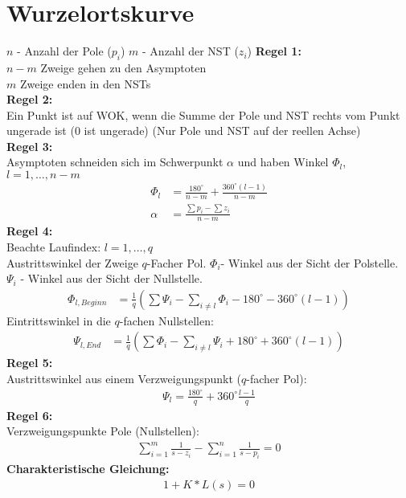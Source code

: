     \section{Wurzelortskurve}
\begin{tcolorbox}[colback=white!10!white,colframe=blue!50!white,title=Konstruktionsregeln]
    $n$ - Anzahl der Pole ($p_i$)\hspace{1cm}
    $m$ - Anzahl der NST ($z_i$)
    \tcblower  %
    \textbf{Regel 1:}\\
    $n-m$ Zweige gehen zu den  Asymptoten\\
    $m$ Zweige enden in den NSTs\\

    \textbf{Regel 2:}\\
        Ein Punkt ist auf WOK, wenn die Summe der Pole und NST rechts vom Punkt ungerade ist (0 ist ungerade) (Nur Pole und NST auf der reellen Achse)\\
        
    \textbf{Regel 3:}\\
    Asymptoten schneiden sich im Schwerpunkt $\alpha$ und haben Winkel $\Phi_l$, $l =1,\dots,n-m$
    \begin{align*}
        \Phi_l &= \frac{180^\circ}{n-m}+\frac{360^\circ(l-1)}{n-m}\\
        \alpha &=    \frac{\sum p_i - \sum z_i}{n-m}
    \end{align*}
        \textbf{Regel 4:}\\
        Beachte Laufindex: $l=1,\dots,q$\\
        Austrittswinkel  der Zweige $q$-Facher Pol. $\Phi_i$- Winkel aus der Sicht der Polstelle. $\Psi_i$ - Winkel aus der Sicht der Nullstelle.
        \begin{align*}
            \Phi_{l,Beginn} &= \frac{1}{q}\left (\sum\Psi_i-\sum_{i\not= l}\Phi_i-180^\circ-360^\circ(l-1)\right )
        \end{align*}
        Eintrittswinkel in die $q$-fachen Nullstellen:
        \begin{align*}
            \Psi_{l,End} &= \frac{1}{q}\left (\sum\Phi_i-\sum_{i\not= l}\Psi_i+180^\circ+360^\circ(l-1)\right )
        \end{align*}
        \textbf{Regel 5:}\\
        Austrittswinkel aus einem Verzweigungspunkt ($q$-facher Pol):
        \begin{align*}
            \Psi_l = \frac{180^\circ}{q}+360^\circ\frac{l-1}{q}
        \end{align*}
        \textbf{Regel 6:}\\
        Verzweigungspunkte Pole (Nullstellen):
        \begin{align*}
            \sum_{i=1}^{m}\frac{1}{s-z_i}-\sum_{i=1}^{n}\frac{1}{s-p_i} =0
        \end{align*}
        \textbf{Charakteristische Gleichung:}
        \begin{align*}
            1+ K*L(s) = 0
        \end{align*}
        

\end{tcolorbox}

